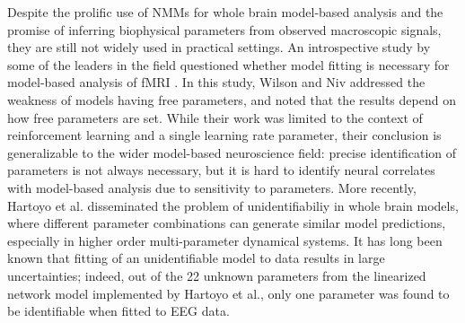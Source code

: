 
Despite the prolific use of NMMs for whole brain model-based analysis and the promise of inferring biophysical parameters from observed macroscopic signals, they are still not widely used in practical settings. An introspective  study by some of the leaders in the field questioned whether model fitting is necessary for model-based analysis of fMRI \cite{wilson_is_2015}. In this study, Wilson and Niv addressed the weakness of models having free parameters, and noted that the results depend on how free parameters are set. While their work was limited to the context of reinforcement learning and a single learning rate parameter, their conclusion is generalizable to the wider model-based neuroscience field: precise identification of parameters is not always necessary, but it is hard to identify neural correlates with model-based analysis due to sensitivity to parameters. More recently, Hartoyo et al. \cite{hartoyo_parameter_2019} disseminated the problem of unidentifiabiliy in whole brain models, where different parameter combinations can generate similar model predictions, especially in higher order multi-parameter dynamical systems. It has long been known that fitting of an unidentifiable model to data results in large uncertainties; indeed, out of the 22 unknown parameters from the linearized network model implemented by Hartoyo et al., only one parameter was found to be identifiable when fitted to EEG data. 

